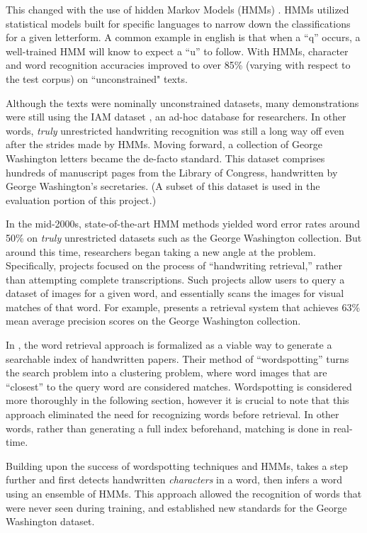 \documentclass[final]{ukthesis}
\begin{document}
This changed with the use of hidden Markov Models (HMMs) \cite{marti2001using,bunke2004offline,el1999hmm}. HMMs utilized statistical models built for specific languages to narrow down the classifications for a given letterform. A common example in english is that when a ``q'' occurs, a well-trained HMM will know to expect a ``u'' to follow. With HMMs, character and word recognition accuracies improved to over 85\% (varying with respect to the test corpus) on ``unconstrained" texts.

Although the texts were nominally unconstrained datasets, many demonstrations were still using the IAM dataset \cite{marti2002iam}, an ad-hoc database for researchers. In other words, {\em truly} unrestricted handwriting recognition was still a long way off even after the strides made by HMMs. Moving forward, a collection of George Washington letters became the de-facto standard. This dataset comprises hundreds of manuscript pages from the Library of Congress, handwritten by George Washington's secretaries. (A subset of this dataset is used in the evaluation portion of this project.)

In the mid-2000s, state-of-the-art HMM methods yielded word error rates around 50\% on {\em truly} unrestricted datasets such as the George Washington collection. But around this time, researchers began taking a new angle at the problem. Specifically, projects focused on the process of ``handwriting retrieval,'' rather than attempting complete transcriptions. Such projects allow users to query a dataset of images for a given word, and essentially scans the images for visual matches of that word. For example, \cite{rath2004search} presents a retrieval system that achieves 63\% mean average precision scores on the George Washington collection.

In \cite{rath2007word}, the word retrieval approach is formalized as a viable way to generate a searchable index of handwritten papers. Their method of ``wordspotting'' turns the search problem into a clustering problem, where word images that are ``closest'' to the query word are considered matches. Wordspotting is considered more thoroughly in the following section, however it is crucial to note that this approach eliminated the need for recognizing words before retrieval. In other words, rather than generating a full index beforehand, matching is done in real-time.

Building upon the success of wordspotting techniques and HMMs, \cite{howe2009finding} takes a step further and first detects handwritten {\em characters} in a word, then infers a word using an ensemble of HMMs. This approach allowed the recognition of words that were never seen during training, and established new standards for the George Washington dataset.
\end{document}
